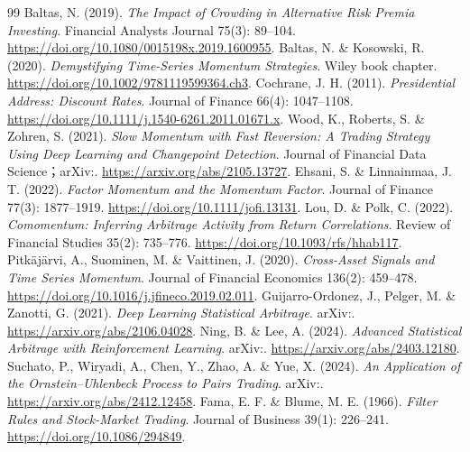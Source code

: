 \begin{thebibliography}{99}
 Baltas, N. (2019). \emph{The Impact of Crowding in Alternative Risk Premia Investing}. Financial Analysts Journal 75(3): 89--104. \href{https://doi.org/10.1080/0015198x.2019.1600955}{https://doi.org/10.1080/0015198x.2019.1600955}.
 Baltas, N. \& Kosowski, R. (2020). \emph{Demystifying Time-Series Momentum Strategies}. Wiley book chapter. \href{https://doi.org/10.1002/9781119599364.ch3}{https://doi.org/10.1002/9781119599364.ch3}.
 Cochrane, J. H. (2011). \emph{Presidential Address: Discount Rates}. Journal of Finance 66(4): 1047--1108. \href{https://doi.org/10.1111/j.1540-6261.2011.01671.x}{https://doi.org/10.1111/j.1540-6261.2011.01671.x}.
 Wood, K., Roberts, S. \& Zohren, S. (2021). \emph{Slow Momentum with Fast Reversion: A Trading Strategy Using Deep Learning and Changepoint Detection}. Journal of Financial Data Science；arXiv:. \href{https://arxiv.org/abs/2105.13727}{https://arxiv.org/abs/2105.13727}.
 Ehsani, S. \& Linnainmaa, J. T. (2022). \emph{Factor Momentum and the Momentum Factor}. Journal of Finance 77(3): 1877--1919. \href{https://doi.org/10.1111/jofi.13131}{https://doi.org/10.1111/jofi.13131}.
 Lou, D. \& Polk, C. (2022). \emph{Comomentum: Inferring Arbitrage Activity from Return Correlations}. Review of Financial Studies 35(2): 735--776. \href{https://doi.org/10.1093/rfs/hhab117}{https://doi.org/10.1093/rfs/hhab117}.
 Pitkäjärvi, A., Suominen, M. \& Vaittinen, J. (2020). \emph{Cross-Asset Signals and Time Series Momentum}. Journal of Financial Economics 136(2): 459--478. \href{https://doi.org/10.1016/j.jfineco.2019.02.011}{https://doi.org/10.1016/j.jfineco.2019.02.011}.
 Guijarro-Ordonez, J., Pelger, M. \& Zanotti, G. (2021). \emph{Deep Learning Statistical Arbitrage}. arXiv:. \href{https://arxiv.org/abs/2106.04028}{https://arxiv.org/abs/2106.04028}.
 Ning, B. \& Lee, A. (2024). \emph{Advanced Statistical Arbitrage with Reinforcement Learning}. arXiv:. \href{https://arxiv.org/abs/2403.12180}{https://arxiv.org/abs/2403.12180}.
 Suchato, P., Wiryadi, A., Chen, Y., Zhao, A. \& Yue, X. (2024). \emph{An Application of the Ornstein--Uhlenbeck Process to Pairs Trading}. arXiv:. \href{https://arxiv.org/abs/2412.12458}{https://arxiv.org/abs/2412.12458}.
 Fama, E. F. \& Blume, M. E. (1966). \emph{Filter Rules and Stock-Market Trading}. Journal of Business 39(1): 226--241. \href{https://doi.org/10.1086/294849}{https://doi.org/10.1086/294849}.

\end{thebibliography}
